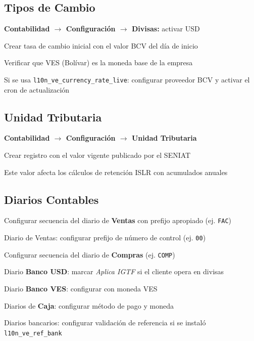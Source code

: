 \documentclass[11pt,a4paper]{article}
\newcommand{\modulo}[1]{\texttt{\textcolor{naranja}{#1}}}
\begin{document}
\begin{Form}
\subsection{Tipos de Cambio}

\begin{checklist}
  \item \textbf{Contabilidad $\rightarrow$ Configuración $\rightarrow$ Divisas:} activar USD
  \item Crear tasa de cambio inicial con el valor BCV del día de inicio
  \item Verificar que VES (Bolívar) es la moneda base de la empresa
  \item Si se usa \modulo{l10n\_ve\_currency\_rate\_live}: configurar proveedor BCV y activar el cron de actualización
\end{checklist}

\subsection{Unidad Tributaria}

\begin{checklist}
  \item \textbf{Contabilidad $\rightarrow$ Configuración $\rightarrow$ Unidad Tributaria}
  \item Crear registro con el valor vigente publicado por el SENIAT
  \item Este valor afecta los cálculos de retención ISLR con acumulados anuales
\end{checklist}

\subsection{Diarios Contables}

\begin{checklist}
  \item Configurar secuencia del diario de \textbf{Ventas} con prefijo apropiado (ej. \texttt{FAC})
  \item Diario de Ventas: configurar prefijo de número de control (ej. \texttt{00})
  \item Configurar secuencia del diario de \textbf{Compras} (ej. \texttt{COMP})
  \item Diario \textbf{Banco USD}: marcar \emph{Aplica IGTF} si el cliente opera en divisas
  \item Diario \textbf{Banco VES}: configurar con moneda VES
  \item Diarios de \textbf{Caja}: configurar método de pago y moneda
  \item Diarios bancarios: configurar validación de referencia si se instaló \modulo{l10n\_ve\_ref\_bank}
\end{checklist}


\end{Form}
\end{document}
